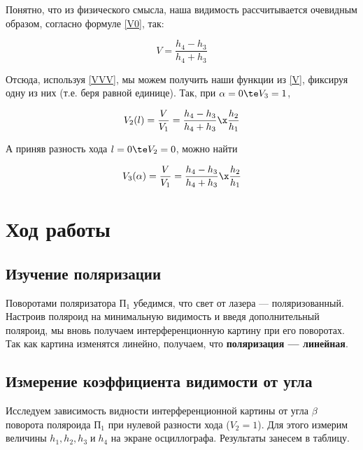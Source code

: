 \documentclass[12pt]{kiarticle}
\begin{document}
Понятно, что из физического смысла, наша видимость рассчитывается очевидным образом, согласно формуле \eqref{V0}, так:

\begin{equation}\label{V}
V = \dfrac{h_4 - h_3}{h_4 + h_3}
\end{equation}

Отсюда, используя \eqref{VVV}, мы можем получить наши функции из \eqref{V}, фиксируя одну из них (т.е. беря равной единице). Так, при $ \alpha = 0 \te V_3 = 1 $, 

\begin{equation}\label{V2}
V_2 (l) = \dfrac{V}{V_1} = \dfrac{h_4 - h_3}{h_4 + h_3} \x \dfrac{h_2}{h_1}
\end{equation}

А приняв разность хода $ l = 0 \te V_2 = 0 $, можно найти 

\begin{equation}\label{V_3}
V_3(\alpha) = \dfrac{V}{V_1} = \dfrac{h_4 - h_3}{h_4 + h_3} \x \dfrac{h_2}{h_1}
\end{equation}

\section{Ход работы}

\subsection{Изучение поляризации}

Поворотами поляризатора $ П_1 $ убедимся, что свет от лазера --- поляризованный. Настроив поляроид на минимальную видимость и введя дополнительный поляроид, мы вновь получаем интерференционную картину при его поворотах. Так как картина изменятся линейно, получаем, что \textbf{поляризация --- линейная}.

\subsection{Измерение коэффициента видимости от угла}

Исследуем зависимость видности интерференционной картины от угла
$ \beta $ поворота поляроида $ П_1 $ при нулевой разности хода ($ V_2 = 1 $). Для этого измерим величины $ h_1, h_2, h_3 \; и \; h_4 $ на экране осциллографа. Результаты занесем в таблицу.


	
	
\end{document}
